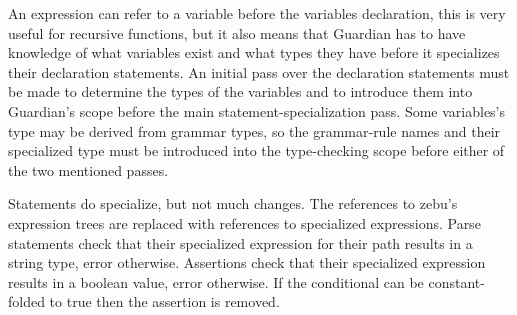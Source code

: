 {	An expression can refer to a variable before the variables declaration,
	this is very useful for recursive functions, but it also means that
	Guardian has to have knowledge of what variables exist and what
	types they have before it
	specializes their declaration statements. An initial pass over
	the declaration statements
	must be made to determine the types of the variables and to introduce them
	into Guardian's scope before the main
	statement-specialization pass. Some variables's type may be derived from
	grammar types, so the grammar-rule names and their specialized type must
	be introduced into the type-checking scope before either of the two
	mentioned passes.
	
	Statements do specialize, but not much changes. The
	references to zebu's expression trees are replaced with references
	to specialized expressions. Parse statements check that their
	specialized expression for their path results in a string type, error
	otherwise. Assertions check that their specialized expression results
	in a boolean value, error otherwise. If the conditional can be
	constant-folded to true then the assertion is removed.
}

































